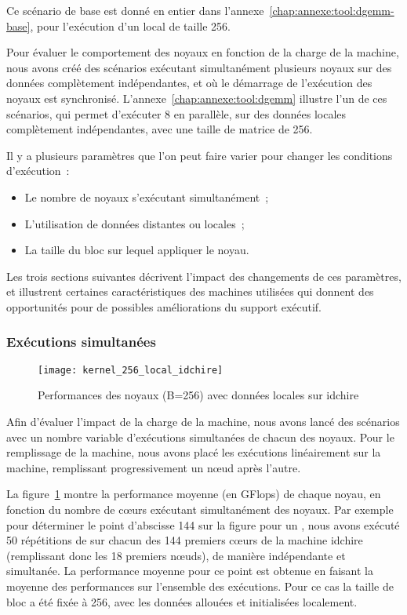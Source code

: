 Ce scénario de base est donné en entier dans l'annexe~\ref{chap:annexe:tool:dgemm-base}, pour l'exécution d'un \gemm local de taille 256.

Pour évaluer le comportement des noyaux en fonction de la charge de la machine, nous avons créé des scénarios exécutant simultanément plusieurs noyaux sur des données complètement indépendantes, et où le démarrage de l'exécution des noyaux est synchronisé.
L'annexe~\ref{chap:annexe:tool:dgemm} illustre l'un de ces scénarios, qui permet d'exécuter 8 \gemm en parallèle, sur des données locales complètement indépendantes, avec une taille de matrice de 256.

Il y a plusieurs paramètres que l'on peut faire varier pour changer les conditions d'exécution~:
\begin{itemize}
  \item Le nombre de noyaux s'exécutant simultanément~;
  \item L'utilisation de données distantes ou locales~;
  \item La taille du bloc sur lequel appliquer le noyau.
\end{itemize}

Les trois sections suivantes décrivent l'impact des changements de ces paramètres, et illustrent certaines caractéristiques des machines utilisées qui donnent des opportunités pour de possibles améliorations du support exécutif.

\subsubsection{Exécutions simultanées}

\begin{figure}[ht]
  \centering
  \texttt{[image: kernel\_256\_local\_idchire]}
  \caption{Performances des noyaux (B=256) avec données locales sur idchire}\label{fig:contribs:apps:cholesky:perf-256-local}
\end{figure}

Afin d'évaluer l'impact de la charge de la machine, nous avons lancé des scénarios avec un nombre variable d'exécutions simultanées de chacun des noyaux.
Pour le remplissage de la machine, nous avons placé les exécutions linéairement sur la machine, remplissant progressivement un nœud après l'autre.

La figure~\ref{fig:contribs:apps:cholesky:perf-256-local} montre la performance moyenne (en GFlops) de chaque noyau, en fonction du nombre de cœurs exécutant simultanément des noyaux.
Par exemple pour déterminer le point d'abscisse 144 sur la figure pour un \gemm, nous avons exécuté 50 répétitions de \gemm sur chacun des 144 premiers cœurs de la machine idchire (remplissant donc les 18 premiers nœuds), de manière indépendante et simultanée.
La performance moyenne pour ce point est obtenue en faisant la moyenne des performances sur l'ensemble des exécutions.
Pour ce cas la taille de bloc a été fixée à 256, avec les données allouées et initialisées localement.

